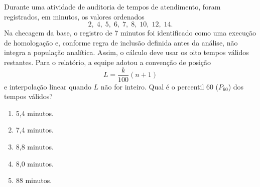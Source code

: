 \documentclass[12pt,a4paper]{article}
\begin{document}
\TextoBase
Durante uma atividade de auditoria de tempos de atendimento, foram registrados, em minutos, os valores ordenados
\[
2,\;4,\;5,\;6,\;7,\;8,\;10,\;12,\;14.
\]
Na checagem da base, o registro de 7 minutos foi identificado como uma execução de homologação e, conforme regra de inclusão definida antes da análise, não integra a população analítica. Assim, o cálculo deve usar os oito tempos válidos restantes. Para o relatório, a equipe adotou a convenção de posição
\[
L=\frac{k}{100}(n+1)
\]
e interpolação linear quando $L$ não for inteiro.
\FonteDidatica
\Comando Qual é o percentil 60 ($P_{60}$) dos tempos válidos?
\begin{enumerate}[label=\Alph*)]
\item 5,4 minutos.
\item 7,4 minutos.
\item 8,8 minutos.
\item 8,0 minutos.
\item 88 minutos.
\end{enumerate}
\end{document}

